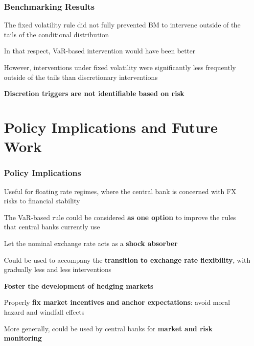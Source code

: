 \documentclass{beamer}
\newenvironment{largeitemize}{\itemize\addtolength{\itemsep}{10pt}}{\enditemize}
\begin{document}
\begin{frame}
  \frametitle{Benchmarking Results}
  \begin{largeitemize}
    \item The fixed volatility rule did not fully prevented BM to intervene
      outside of the tails of the conditional distribution
    \item In that respect, VaR-based intervention would have been better
    \item However, interventions under fixed volatility were significantly
      less frequently outside of the tails than discretionary interventions
    \item \textbf{Discretion triggers are not identifiable based on risk}
  \end{largeitemize}
\end{frame}



\section{Policy Implications and Future Work}

\begin{frame}
  \frametitle{Policy Implications}
  \begin{largeitemize}
   \item Useful for floating rate regimes, where the central bank is concerned with FX
     risks to financial stability
    \item The VaR-based rule could be considered \textbf{as one option} to improve the
      rules that central banks currently use
    \item Let the nominal exchange rate acts as a \textbf{shock absorber}
    \item Could be used to accompany the \textbf{transition to exchange rate
      flexibility}, with gradually less and less interventions
  \item \textbf{Foster the development of hedging markets}
    \item Properly \textbf{fix market incentives
      and anchor expectations}: avoid moral hazard and windfall effects
  \item More generally, could be used by central banks for \textbf{market and risk monitoring}
  \end{largeitemize}
\end{frame}
\end{document}
